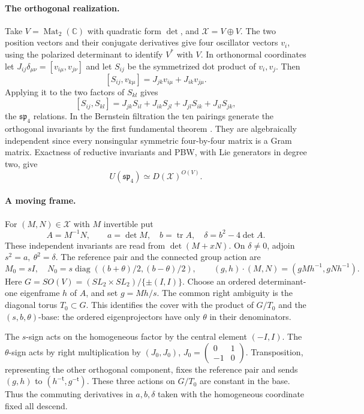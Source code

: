 \documentclass[11pt,a4paper]{article}
\theoremstyle{definition}
\begin{document}
\paragraph{The orthogonal realization.}
Take \(V=\operatorname{Mat}_2(\mathbb C)\) with quadratic form \(\det\), and \(\mathcal X=V\oplus V\). The two position vectors and their conjugate derivatives give four oscillator vectors \(v_i\), using the polarized determinant to identify \(V^*\) with \(V\). In orthonormal coordinates let \(J_{ij}\delta_{\mu\nu}=[v_{i\mu},v_{j\nu}]\) and let \(S_{ij}\) be the symmetrized dot product of \(v_i,v_j\). Then
\[
 [S_{ij},v_{k\mu}]=J_{jk}v_{i\mu}+J_{ik}v_{j\mu}.
\]
Applying it to the two factors of \(S_{kl}\) gives
\[
 [S_{ij},S_{kl}]
 =J_{jk}S_{il}+J_{ik}S_{jl}+J_{jl}S_{ik}+J_{il}S_{jk},
\]
the \(\mathfrak{sp}_4\) relations. In the Bernstein filtration the ten pairings generate the orthogonal invariants by the first fundamental theorem \cite[Theorem~5.2.2]{GW}. They are algebraically independent since every nonsingular symmetric four-by-four matrix is a Gram matrix. Exactness of reductive invariants and PBW, with Lie generators in degree two, give
\begin{equation}\label{eq:c2osc}
 U(\mathfrak{sp}_4)\simeq D(\mathcal X)^{O(V)} .
\end{equation}

\paragraph{A moving frame.}
For \((M,N)\in\mathcal X\) with \(M\) invertible put
\[
 A=M^{-1}N,\qquad a=\det M,\quad b=\operatorname{tr}A,\quad
 \delta=b^2-4\det A .
\]
These independent invariants are read from \(\det(M+xN)\). On \(\delta\ne0\), adjoin \(s^2=a,\ \theta^2=\delta\). The reference pair and the connected group action are
\[
 M_0=sI,\quad N_0=s\operatorname{diag}((b+\theta)/2,(b-\theta)/2),
 \qquad (g,h)\cdot(M,N)=(gMh^{-1},gNh^{-1}).
\]
Here \(G=SO(V)=(SL_2\times SL_2)/\{\pm(I,I)\}\). Choose an ordered determinant-one eigenframe \(h\) of \(A\), and set \(g=Mh/s\). The common right ambiguity is the diagonal torus \(T_0\subset G\). This identifies the cover with the product of \(G/T_0\) and the \((s,b,\theta)\)-base: the ordered eigenprojectors have only \(\theta\) in their denominators.

The \(s\)-sign acts on the homogeneous factor by the central element \((-I,I)\). The \(\theta\)-sign acts by right multiplication by \((J_0,J_0)\), \(J_0=\left(\begin{smallmatrix}0&1\\-1&0\end{smallmatrix}\right)\). Transposition, representing the other orthogonal component, fixes the reference pair and sends \((g,h)\) to \((h^{-\mathsf t},g^{-\mathsf t})\). These three actions on \(G/T_0\) are constant in the base. Thus the commuting derivatives in \(a,b,\delta\) taken with the homogeneous coordinate fixed all descend.
\end{document}
